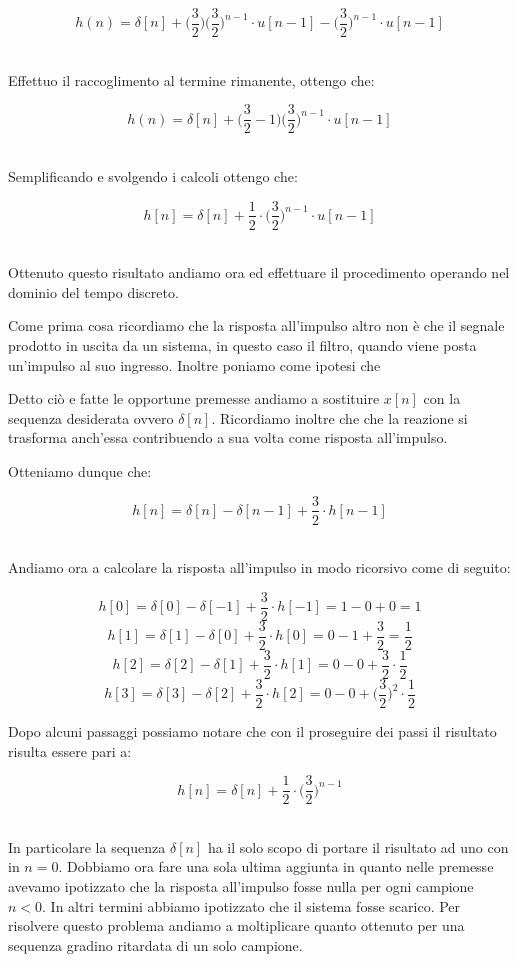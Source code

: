 \documentclass[../main.tex]{subfiles}
\begin{document}
\[ h(n) = \delta[n] + \bigg(\frac{3}{2}\bigg)\bigg(\frac{3}{2}\bigg)^{n-1} \cdot  u[n-1]  - \bigg(\frac{3}{2}\bigg)^{n-1}  \cdot u[n-1]  \]\

Effettuo il raccoglimento al termine rimanente, ottengo che:

\[ h(n) = \delta[n] + \bigg( \frac{3}{2} - 1 \bigg) \bigg(\frac{3}{2}\bigg)^{n-1} \cdot  u[n-1] \]\

Semplificando e svolgendo i calcoli ottengo che:

\[ h[n] = \delta[n] +  \frac{1}{2} \cdot \bigg(\frac{3}{2}\bigg)^{n-1} \cdot  u[n-1] \]\

Ottenuto questo risultato andiamo ora ed effettuare il procedimento operando nel dominio del tempo discreto.

Come prima cosa ricordiamo che la risposta all'impulso altro non è che il segnale prodotto in uscita da un sistema, in questo caso il filtro, quando viene posta un'impulso al suo ingresso.
Inoltre poniamo come ipotesi che %

Detto ciò e fatte le opportune premesse andiamo a sostituire $x[n]$ con la sequenza desiderata ovvero $\delta[n]$. Ricordiamo inoltre che che la reazione si trasforma anch'essa contribuendo a sua volta come risposta all'impulso. 

Otteniamo dunque che:

\[ h[n] = \delta[n] - \delta[n-1] + \frac{3}{2} \cdot h[n-1] \]\

Andiamo ora a calcolare la risposta all'impulso in modo ricorsivo come di seguito:

\[ h[0] = \delta[0] - \delta[-1] + \frac{3}{2}\cdot h[-1] = 1 - 0 + 0 = 1\]
\[ h[1] = \delta[1] - \delta[0] + \frac{3}{2}\cdot h[0] = 0 - 1 + \frac{3}{2} = \frac{1}{2}\]
\[ h[2] = \delta[2] - \delta[1] + \frac{3}{2}\cdot h[1] = 0 - 0 + \frac{3}{2} \cdot \frac{1}{2}\]
\[ h[3] = \delta[3] - \delta[2] + \frac{3}{2}\cdot h[2] = 0 - 0 + \bigg(\frac{3}{2}\bigg)^2 \cdot \frac{1}{2}\]


Dopo alcuni passaggi possiamo notare che con il proseguire dei passi il risultato risulta essere pari a:

\[ h[n] = \delta[n] + \frac{1}{2} \cdot \bigg(\frac{3}{2}\bigg)^{n-1} \]\

In particolare la sequenza $\delta[n]$ ha il solo scopo di portare il risultato ad uno con in $n = 0$.
Dobbiamo ora fare una sola ultima aggiunta in quanto nelle premesse avevamo ipotizzato che la risposta all'impulso fosse nulla per ogni campione $n < 0$. In altri termini abbiamo ipotizzato che il sistema fosse scarico. Per risolvere questo problema andiamo a moltiplicare quanto ottenuto per una sequenza gradino ritardata di un solo campione. 
\end{document}
